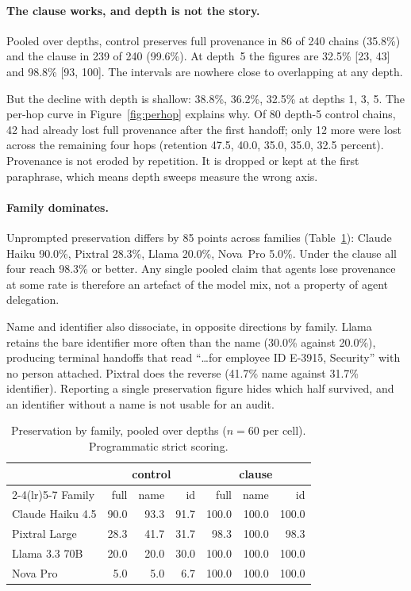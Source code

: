 \documentclass{article}
\begin{document}
\paragraph{The clause works, and depth is not the story.}
Pooled over depths, control preserves full provenance in 86 of 240 chains (35.8\%) and the clause
in 239 of 240 (99.6\%). At depth~5 the figures are 32.5\% [23, 43] and 98.8\% [93, 100]. The
intervals are nowhere close to overlapping at any depth.

But the decline with depth is shallow: 38.8\%, 36.2\%, 32.5\% at depths 1, 3, 5. The per-hop curve
in Figure~\ref{fig:perhop} explains why. Of 80 depth-5 control chains, 42 had already lost full
provenance after the first handoff; only 12 more were lost across the remaining four hops
(retention 47.5, 40.0, 35.0, 35.0, 32.5 percent). Provenance is not eroded by repetition. It is
dropped or kept at the first paraphrase, which means depth sweeps measure the wrong axis.

\paragraph{Family dominates.}
Unprompted preservation differs by 85 points across families (Table~\ref{tab:fam}): Claude Haiku
90.0\%, Pixtral 28.3\%, Llama 20.0\%, Nova~Pro 5.0\%. Under the clause all four reach 98.3\% or
better. Any single pooled claim that agents lose provenance at some rate is therefore an artefact
of the model mix, not a property of agent delegation.

Name and identifier also dissociate, in opposite directions by family. Llama retains the bare
identifier more often than the name (30.0\% against 20.0\%), producing terminal handoffs that read
``\ldots for employee ID E-3915, Security'' with no person attached. Pixtral does the reverse
(41.7\% name against 31.7\% identifier). Reporting a single preservation figure hides which half
survived, and an identifier without a name is not usable for an audit.

\begin{table}[t]
\centering\small
\caption{Preservation by family, pooled over depths ($n=60$ per cell). Programmatic strict scoring.}
\label{tab:fam}
\begin{tabular}{lrrr rrr}
\toprule
& \multicolumn{3}{c}{\textbf{control}} & \multicolumn{3}{c}{\textbf{clause}} \\
\cmidrule(lr){2-4}\cmidrule(lr){5-7}
Family & full & name & id & full & name & id \\
\midrule
Claude Haiku 4.5 & 90.0 & 93.3 & 91.7 & 100.0 & 100.0 & 100.0 \\
Pixtral Large    & 28.3 & 41.7 & 31.7 &  98.3 & 100.0 &  98.3 \\
Llama 3.3 70B    & 20.0 & 20.0 & 30.0 & 100.0 & 100.0 & 100.0 \\
Nova Pro         &  5.0 &  5.0 &  6.7 & 100.0 & 100.0 & 100.0 \\
\bottomrule
\end{tabular}
\end{table}
\end{document}
